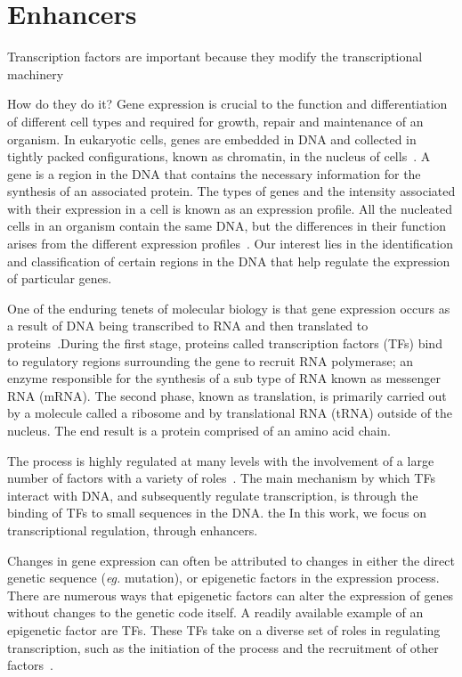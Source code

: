 \section{Enhancers}
    Transcription factors are important because they modify the transcriptional machinery
    
    How do they do it?
        Gene expression is crucial to the function and differentiation of different cell types and required for growth, repair and maintenance of an organism.  In eukaryotic cells, genes are embedded in DNA and collected in tightly packed configurations, known as chromatin, in the nucleus of cells~\cite{alberts2002chromosomal}.  A gene is a region in the DNA that contains the necessary information for the synthesis of an associated protein.
        The types of genes and the intensity associated with their expression in a cell is known as an expression profile. All the nucleated cells in an organism contain the same DNA, but the differences in their function arises from the different expression profiles~\cite{lockhart2000genomics}. Our interest lies in the identification and classification of certain regions in the DNA that help regulate the expression of particular genes. 
       

        One of the enduring tenets of molecular biology is that gene expression occurs as a result of DNA being transcribed to RNA and then translated to proteins~\cite{crick1958protein}.During the first stage, proteins called transcription factors (TFs) bind to regulatory regions surrounding the gene to recruit RNA polymerase; an enzyme responsible for the synthesis of a sub type of RNA known as messenger RNA (mRNA). 
        The second phase, known as translation, is primarily carried out by a molecule called a ribosome and by translational RNA (tRNA) outside of the nucleus. The end result is a protein comprised of an amino acid chain.
        
        The process is highly regulated at many levels with the involvement of a large number of factors with a variety of roles~\cite{lemon2000orchestrated}. The main mechanism by which TFs interact with DNA, and subsequently regulate transcription, is through the binding of TFs to small sequences in the DNA. the In this work, we focus on transcriptional regulation, through enhancers.
        
        Changes in gene expression can often be attributed to changes in either the direct genetic sequence (\emph{eg.} mutation), or epigenetic factors in the expression process. There are numerous ways that epigenetic factors can alter the expression of genes without changes to the genetic code itself. A readily available example of an epigenetic factor are TFs. These TFs take on a diverse set of roles in regulating transcription, such as the initiation of the process and the recruitment of other factors~\cite{lemon2000orchestrated}.
        
